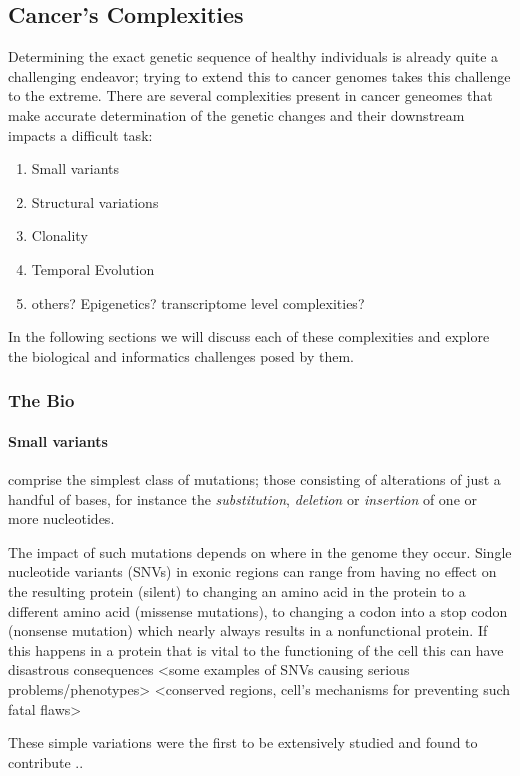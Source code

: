 \subsection{Cancer's Complexities}

Determining the exact genetic sequence of healthy individuals is already quite a challenging endeavor; trying to extend this to cancer genomes takes this challenge to the extreme. There are several complexities present in cancer geneomes that make accurate determination of the genetic changes and their downstream impacts a difficult task:

\begin{enumerate}
\item Small variants
\item Structural variations
\item Clonality
\item Temporal Evolution
\item others? Epigenetics? transcriptome level complexities?
\end{enumerate}

In the following sections we will discuss each of these complexities and explore the biological and informatics challenges posed by them.

\subsubsection{The Bio}
\paragraph{Small variants} comprise the simplest class of mutations; those consisting of alterations of just a handful of bases, for instance the \emph{substitution}, \emph{deletion} or \emph{insertion} of one or more nucleotides.

The impact of such mutations depends on where in the genome they occur. Single nucleotide variants (SNVs) in exonic regions can range from having no effect on the resulting protein (silent) to changing an amino acid in the protein to a different amino acid (missense mutations), to changing a codon into a stop codon (nonsense mutation) which nearly always results in a nonfunctional protein. If this happens in a protein that is vital to the functioning of the cell this can have disastrous consequences <some examples of SNVs causing serious problems/phenotypes> <conserved regions, cell's mechanisms for preventing such fatal flaws>

These simple variations were the first to be extensively studied and found to contribute ..

